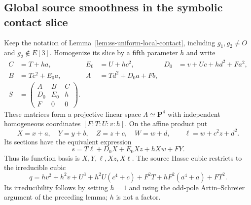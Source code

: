 \subsection{Global source smoothness in the symbolic contact slice}
\label{subsec:ss-uniform-source-smoothness}

Keep the notation of Lemma~\ref{lem:ss-uniform-local-contact},
including $g_1,g_2\ne O$ and $g_2\notin E[3]$. Homogenize its slice
by a fifth parameter $h$ and write
\[
\begin{aligned}
 C&=T+ha,&E_0&=U+hc^2,&D_0&=v+Uc+hd^2+Fa^2,\\
 B&=Tc^2+E_0a,&A&=Td^2+D_0a+Fb,\\
 S&=\begin{pmatrix}A&B&C\\D_0&E_0&h\\F&0&0\end{pmatrix}.
\end{aligned}
\]
These matrices form a projective linear space $\Lambda\simeq\mathbf P^4$
with independent homogeneous coordinates $[F:T:U:v:h]$.
On the affine product put
\[
 X=x+a,\quad Y=y+b,\quad Z=z+c,\quad W=w+d,
 \qquad \ell=w+c^2z+d^2.
\]
Its sections have the equivalent expression
\begin{equation}\label{eq:ss-contact-linear-system}
 s=T\ell+D_0X+E_0Xz+hXw+FY.
\end{equation}
Thus its function basis is $X,Y,\ell,Xz,X\ell$.
The source Hasse cubic restricts to the irreducible cubic
\begin{equation}\label{eq:ss-contact-cubic-homogeneous}
 q=h v^2+h^2v+U^3+h^2U(c^4+c)
                       +F^2T+hF^2(a^4+a)+FT^2.
\end{equation}
Its irreducibility follows by setting $h=1$ and using the odd-pole
Artin--Schreier argument of the preceding lemma; $h$ is not a factor.

